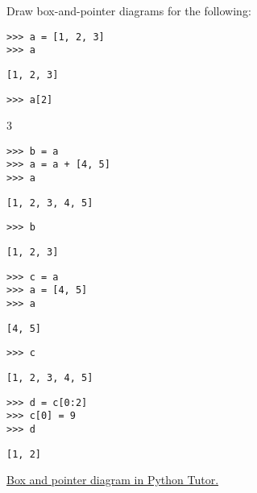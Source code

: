 \begin{blocksection}
\question Draw box-and-pointer diagrams for the following:

\begin{lstlisting}
>>> a = [1, 2, 3]
>>> a
\end{lstlisting}
\begin{solution}[.25in]
\begin{lstlisting}
[1, 2, 3]
\end{lstlisting}
\end{solution}

\begin{lstlisting}
>>> a[2]
\end{lstlisting}
\begin{solution}[.25in]
3
\end{solution}

\begin{lstlisting}
>>> b = a
>>> a = a + [4, 5]
>>> a
\end{lstlisting}
\begin{solution}[.25in]
\begin{lstlisting}
[1, 2, 3, 4, 5]
\end{lstlisting}
\end{solution}
\begin{lstlisting}
>>> b
\end{lstlisting}
\begin{solution}[.25in]
\begin{lstlisting}
[1, 2, 3]
\end{lstlisting}
\end{solution}

\begin{lstlisting}
>>> c = a
>>> a = [4, 5]
>>> a
\end{lstlisting}
\begin{solution}[.25in]
\begin{lstlisting}
[4, 5]
\end{lstlisting}
\end{solution}

\begin{lstlisting}
>>> c
\end{lstlisting}
\begin{solution}[.25in]
\begin{lstlisting}
[1, 2, 3, 4, 5]
\end{lstlisting}
\end{solution}

\begin{lstlisting}
>>> d = c[0:2]
>>> c[0] = 9
>>> d

\end{lstlisting}
\begin{solution}
\begin{lstlisting}
[1, 2]
\end{lstlisting}
\end{solution}

\begin{solution}
\href{https://goo.gl/ZdFcg6}{Box and pointer diagram in Python Tutor.}
\end{solution}
\end{blocksection}
